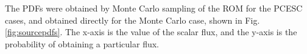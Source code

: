 The PDFs were obtained by Monte Carlo sampling of the ROM for the PCESC cases, and obtained directly for the Monte Carlo case, shown in Fig. \ref{fig:sourcepdfs}.  The x-axis is the value of the scalar flux, and the y-axis is the probability of obtaining a particular flux.


%
